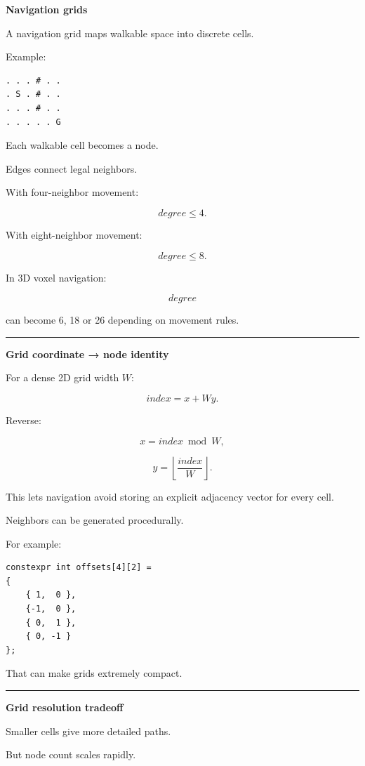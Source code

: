 \textbf{Navigation grids}

A navigation grid maps walkable space into discrete cells.

Example:

\begin{verbatim}
. . . # . .
. S . # . .
. . . # . .
. . . . . G
\end{verbatim}

Each walkable cell becomes a node.

Edges connect legal neighbors.

With four-neighbor movement:

\[
degree\le4.
\]

With eight-neighbor movement:

\[
degree\le8.
\]

In 3D voxel navigation:

\[
degree
\]

can become 6, 18 or 26 depending on movement rules.

\begin{center}\rule{0.5\linewidth}{0.5pt}\end{center}

\textbf{Grid coordinate → node identity}

For a dense 2D grid width \(W\):

\[
index=x+Wy.
\]

Reverse:

\[
x=index\bmod W,
\]

\[
y=\left\lfloor
\frac{index}{W}
\right\rfloor.
\]

This lets navigation avoid storing an explicit adjacency vector for every cell.

Neighbors can be generated procedurally.

For example:

\begin{verbatim}
constexpr int offsets[4][2] =
{
    { 1,  0 },
    {-1,  0 },
    { 0,  1 },
    { 0, -1 }
};
\end{verbatim}

That can make grids extremely compact.

\begin{center}\rule{0.5\linewidth}{0.5pt}\end{center}

\textbf{Grid resolution tradeoff}

Smaller cells give more detailed paths.

But node count scales rapidly.

